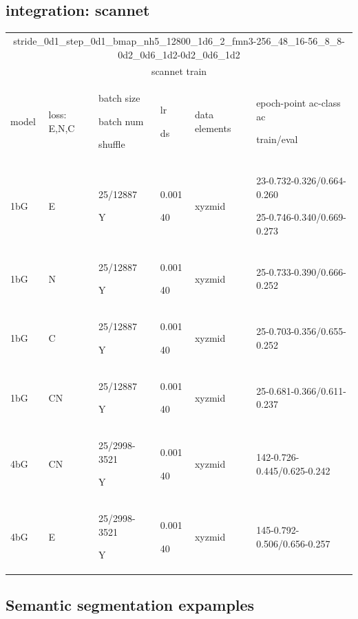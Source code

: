 \documentclass{article}
\begin{document}
\subsection{integration: scannet}
\begin{center}
	\centering {} \small
	\begin{tabular}{|p{1cm} |p{1cm} |p{1.5cm} | p{2cm} | p{3.5cm} || p{4cm}|} 
		\hline
		\multicolumn{6}{|c|}{stride\_0d1\_step\_0d1\_bmap\_nh5\_12800\_1d6\_2\_fmn3-256\_48\_16-56\_8\_8-0d2\_0d6\_1d2-0d2\_0d6\_1d2 }\\
		\multicolumn{6}{|c|}{ scannet train }\\
		\hline
		model & loss: E,N,C & batch size\par batch num \par shuffle& lr\par ds & data elements & epoch-point ac-class ac \par train/eval \\
		\hline
		1bG & E & 25/12887\par Y & 0.001\par 40 & xyzmid & 23-0.732-0.326/0.664-0.260 \par 25-0.746-0.340/0.669-0.273\\ \hline
		1bG & N & 25/12887\par Y & 0.001\par 40 & xyzmid & 25-0.733-0.390/0.666-0.252\\ \hline
		1bG & C & 25/12887\par Y & 0.001\par 40 & xyzmid & 25-0.703-0.356/0.655-0.252\\ \hline
		1bG & CN & 25/12887\par Y & 0.001\par 40 & xyzmid & 25-0.681-0.366/0.611-0.237\\ \hline
		
		4bG & CN & 25/2998-3521\par Y & 0.001\par 40 & xyzmid & 142-0.726-0.445/0.625-0.242\\
		\hline
		4bG & E & 25/2998-3521\par Y & 0.001\par 40 & xyzmid & 145-0.792-0.506/0.656-0.257\\
		\hline
	\end{tabular}
\end{center}


\subsection{Semantic segmentation expamples}
\end{document}
